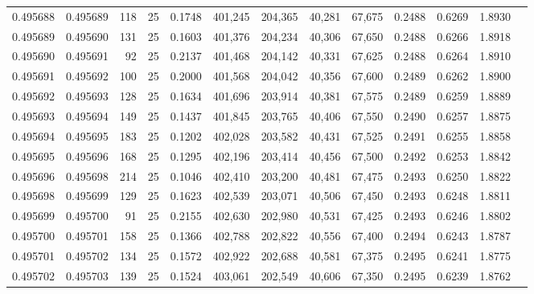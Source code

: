 \begin{tabular}{rrrrrrrrrrrrr}
0.495688 & 0.495689 &   118 &  25 &                                     0.1748 & 401,245 & 204,365 &  40,281 &  67,675 & 0.2488 & 0.6269 & 1.8930 \\
0.495689 & 0.495690 &   131 &  25 &                                     0.1603 & 401,376 & 204,234 &  40,306 &  67,650 & 0.2488 & 0.6266 & 1.8918 \\
0.495690 & 0.495691 &    92 &  25 &                                     0.2137 & 401,468 & 204,142 &  40,331 &  67,625 & 0.2488 & 0.6264 & 1.8910 \\
0.495691 & 0.495692 &   100 &  25 &                                     0.2000 & 401,568 & 204,042 &  40,356 &  67,600 & 0.2489 & 0.6262 & 1.8900 \\
0.495692 & 0.495693 &   128 &  25 &                                     0.1634 & 401,696 & 203,914 &  40,381 &  67,575 & 0.2489 & 0.6259 & 1.8889 \\
0.495693 & 0.495694 &   149 &  25 &                                     0.1437 & 401,845 & 203,765 &  40,406 &  67,550 & 0.2490 & 0.6257 & 1.8875 \\
0.495694 & 0.495695 &   183 &  25 &                                     0.1202 & 402,028 & 203,582 &  40,431 &  67,525 & 0.2491 & 0.6255 & 1.8858 \\
0.495695 & 0.495696 &   168 &  25 &                                     0.1295 & 402,196 & 203,414 &  40,456 &  67,500 & 0.2492 & 0.6253 & 1.8842 \\
0.495696 & 0.495698 &   214 &  25 &                                     0.1046 & 402,410 & 203,200 &  40,481 &  67,475 & 0.2493 & 0.6250 & 1.8822 \\
0.495698 & 0.495699 &   129 &  25 &                                     0.1623 & 402,539 & 203,071 &  40,506 &  67,450 & 0.2493 & 0.6248 & 1.8811 \\
0.495699 & 0.495700 &    91 &  25 &                                     0.2155 & 402,630 & 202,980 &  40,531 &  67,425 & 0.2493 & 0.6246 & 1.8802 \\
0.495700 & 0.495701 &   158 &  25 &                                     0.1366 & 402,788 & 202,822 &  40,556 &  67,400 & 0.2494 & 0.6243 & 1.8787 \\
0.495701 & 0.495702 &   134 &  25 &                                     0.1572 & 402,922 & 202,688 &  40,581 &  67,375 & 0.2495 & 0.6241 & 1.8775 \\
0.495702 & 0.495703 &   139 &  25 &                                     0.1524 & 403,061 & 202,549 &  40,606 &  67,350 & 0.2495 & 0.6239 & 1.8762 \\

\end{tabular}
